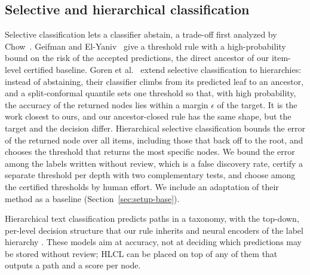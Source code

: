 \documentclass[preprint,12pt]{elsarticle}
\theoremstyle{definition}
\newcommand{\hlcl}{\textup{\textsc{HLCL}}}
\begin{document}
\subsection{Selective and hierarchical classification}
Selective classification lets a classifier abstain, a trade-off first analyzed
by Chow~\cite{chow1970optimum}. Geifman and El-Yaniv~\cite{geifman2017selective} give a threshold rule
with a high-probability bound on the risk of the accepted predictions, the
direct ancestor of our item-level certified baseline.
Goren et al.~\cite{goren2024hierarchical} extend selective classification to
hierarchies: instead of abstaining, their classifier climbs from its predicted
leaf to an ancestor, and a split-conformal quantile sets one threshold so that,
with high probability, the accuracy of the returned nodes lies within a margin
$\epsilon$ of the target. It is the work closest to ours, and our
ancestor-closed rule has the same shape, but the target and the decision
differ. Hierarchical selective classification bounds the error of the
returned node over all items, including those that back off to the root, and
chooses the threshold that returns the most specific nodes. We bound the error
among the labels written without review, which is a false discovery rate,
certify a separate threshold per depth with two complementary tests, and choose
among the certified thresholds by human effort. We include an adaptation of
their method as a baseline (Section~\ref{sec:setup-base}).

Hierarchical text classification predicts paths in a taxonomy, with the
top-down, per-level decision structure that our rule inherits
\citep{silla2011survey} and neural encoders of the label hierarchy
\citep{zhou2020hiagm}. These models aim at accuracy, not at deciding which
predictions may be stored without review; \hlcl{} can be placed on top of any of them that outputs a path and a score per
node.
\end{document}
